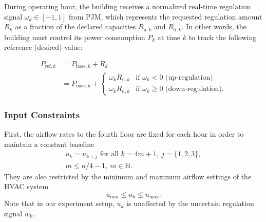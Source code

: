 During operating hour, the building receives a normalized real-time regulation signal $\omega_k \in [-1,1]$ from PJM, which represents the requested regulation amount $R_k$ as a fraction of the declared capacities $R_{\text{u},k}$ and $R_{\text{d},k}$. In other words, the building must control its power consumption $P_k$ at time $k$ to track the following reference (desired) value:

\begin{equation}\label{eq:P_ref}
\begin{aligned}
P_{\text{ref},k} &= P_{\text{base},k}+R_k \\
	&= P_{\text{base},k}+\begin{cases}
	\omega_k R_{\text{u},k} & \mbox{if } \omega_k < 0 \mbox{ (up-regulation)} \\ 
	\omega_k R_{\text{d},k} & \mbox{if } \omega_k \geq 0 \mbox{ (down-regulation).} 
	\end{cases} 
\end{aligned}
\end{equation}



\subsubsection{Input Constraints}


First, the airflow rates to the fourth floor are fixed for each hour in order to maintain a constant baseline
\begin{multline}\label{eq:u_constraint_const}
u_k = u_{k+j} \text{~for all~} k = 4m+1,~ j = \{1,2,3\}, \\
m \leq n/4-1, ~m \in \mathbb{N}.
\end{multline}
They are also restricted by the minimum and maximum airflow settings of the HVAC system
\begin{equation}\label{eq:u_constraint}
u_{\text{min}} \leq u_{k} \leq u_{\text{max}}.
\end{equation}
Note that in our experiment setup, $u_k$ is unaffected by the uncertain regulation signal $w_k$.

